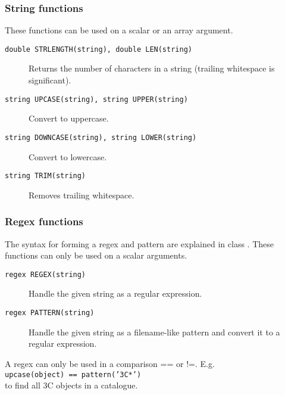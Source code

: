 \subsubsection{String functions}
These functions can be used on a scalar or an array argument.
\begin{description}
  \item[ \texttt{double STRLENGTH(string),  double LEN(string)}]
       Returns the number of characters in a string
       (trailing whitespace is significant).
  \item[ \texttt{string UPCASE(string), string UPPER(string) }]
        Convert to uppercase.
  \item[ \texttt{string DOWNCASE(string),  string LOWER(string)}]
        Convert to lowercase.
  \item[ \texttt{string TRIM(string)}]
       Removes trailing whitespace.
\end{description}

\subsubsection{Regex functions}
The syntax for forming a regex and pattern are explained in class
.
These functions can only be used on a scalar arguments.

\begin{description}
  \item[ \texttt{regex REGEX(string)}]
       Handle the given string as a regular expression.
  \item[ \texttt{regex PATTERN(string)}]
       Handle the given string as a filename-like pattern and
       convert it to a regular expression.
\end{description}
A regex can only be used in a comparison == or !=. E.g.
\\\texttt{upcase(object) == pattern('3C*')}
\\to find all 3C objects in a catalogue.

